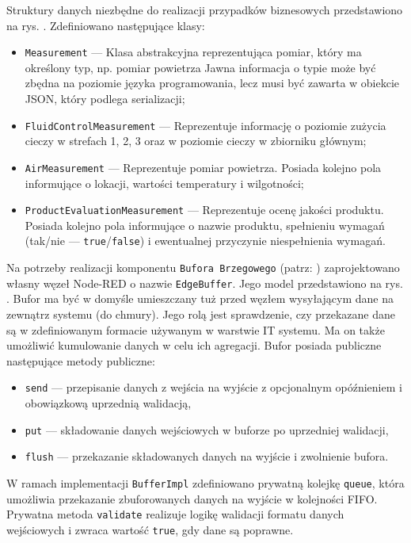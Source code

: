 \documentclass[a4paper, 12pt, twoside]{article}
\begin{document}
Struktury danych niezbędne do realizacji przypadków biznesowych
przedstawiono na rys. . Zdefiniowano następujące klasy:
\begin{itemize}
      \itemsep0em
      \item \texttt{Measurement} --- Klasa abstrakcyjna reprezentująca pomiar, który ma określony typ, np. pomiar powietrza
            Jawna informacja o typie może być zbędna na poziomie języka programowania, lecz musi być zawarta w obiekcie JSON, który podlega serializacji;
      \item \texttt{FluidControlMeasurement} --- Reprezentuje informację o poziomie zużycia cieczy w strefach 1, 2, 3 oraz w poziomie cieczy w zbiorniku głównym;
      \item \texttt{AirMeasurement} --- Reprezentuje pomiar powietrza. Posiada kolejno pola informujące o lokacji, wartości temperatury i wilgotności;
      \item \texttt{ProductEvaluationMeasurement} --- Reprezentuje ocenę jakości produktu. Posiada kolejno pola informujące o nazwie produktu,
            spełnieniu wymagań (tak/nie --- \texttt{true}/\texttt{false}) i ewentualnej przyczynie niespełnienia wymagań.
\end{itemize}

Na potrzeby realizacji komponentu \texttt{Bufora Brzegowego} (patrz: )
zaprojektowano własny węzeł Node-RED o nazwie \texttt{EdgeBuffer}.
Jego model przedstawiono na rys. .
Bufor ma być w domyśle umieszczany tuż przed węzłem wysyłającym dane na
zewnątrz systemu (do chmury). Jego rolą jest sprawdzenie, czy przekazane dane
są w zdefiniowanym formacie używanym w warstwie IT systemu. Ma on także umożliwić
kumulowanie danych w celu ich agregacji. Bufor posiada publiczne następujące
metody publiczne:
\begin{itemize}
      \itemsep0em
      \item \texttt{send} --- przepisanie danych z wejścia na wyjście z
            opcjonalnym opóźnieniem i obowiązkową uprzednią walidacją,
      \item \texttt{put} --- składowanie danych wejściowych w buforze po uprzedniej walidacji,
      \item \texttt{flush} --- przekazanie składowanych danych na wyjście
            i zwolnienie bufora.
\end{itemize}
\noindent W ramach implementacji \texttt{BufferImpl} zdefiniowano
prywatną kolejkę \texttt{queue}, która umożliwia przekazanie zbuforowanych
danych na wyjście w kolejności FIFO. Prywatna metoda \texttt{validate} realizuje
logikę walidacji formatu danych wejściowych i zwraca wartość \texttt{true},
gdy dane są poprawne.
\end{document}
